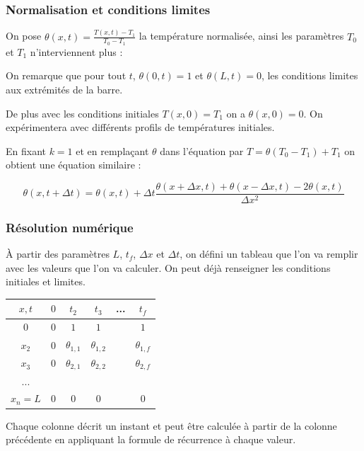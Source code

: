 \documentclass{beamer}
\begin{document}
    \begin{frame}
    \frametitle{Normalisation et conditions limites}


    On pose $\theta(x,t) = \frac{T(x,t) -T_1}{T_0 - T_1}$ la température normalisée,
    ainsi les paramètres $T_0$ et $T_1$ n'interviennent plus :

    \medskip

    On remarque que pour tout $t$, $\theta(0, t) = 1$ et $\theta(L, t) = 0$, les conditions limites aux extrémités de la barre.

    \medskip

    De plus avec les conditions initiales $T(x,0)=T_1$ on a $\theta(x, 0) = 0$. On expérimentera avec différents profils de températures initiales.

    \bigskip

    En fixant $k = 1$ et en remplaçant $\theta$ dans l'équation par $T = \theta(T_0 - T_1) + T_1$ on obtient une équation similaire :

    $$\boxed{\theta(x, t + \Delta t) = \theta(x, t) + \Delta t \frac{\theta(x+ \Delta x, t) + \theta(x-\Delta x, t) -2\theta(x, t)}{\Delta x ^2 }}$$


    \end{frame}


    \begin{frame}
    \frametitle{Résolution numérique}

    À partir des paramètres $L$, $t_f$, $\Delta x$ et $\Delta t$, on défini un tableau que l'on va remplir avec les valeurs que l'on va calculer. On peut déjà renseigner les conditions initiales et limites.

    \begin{center}
	    \begin{tabular}{ |c|c|c|c|c|c| }
	     \hline
	     $x, t$ & $0$ & $t_2$ & $t_3$ & ... & $t_f$ \\
	     \hline
	     $0$   & $0$ & $1$ & $1$ &  & $1$\\
	     $x_2$ & $0$ & $\theta_{1,1}$ & $\theta_{1,2}$ &  & $\theta_{1,f}$\\
	     $x_3$ & $0$ & $\theta_{2,1}$ & $\theta_{2,2}$ &  & $\theta_{2,f}$\\
	     ... &   &   &   &  &  \\
	     $x_n = L$ &   $0$ & $0$ & $0$ &  & $0$\\
	     \hline
	    \end{tabular}
  	\end{center}

  	Chaque colonne décrit un instant et peut être calculée à partir de la colonne précédente en appliquant la formule de récurrence à chaque valeur.

    \end{frame}
\end{document}
